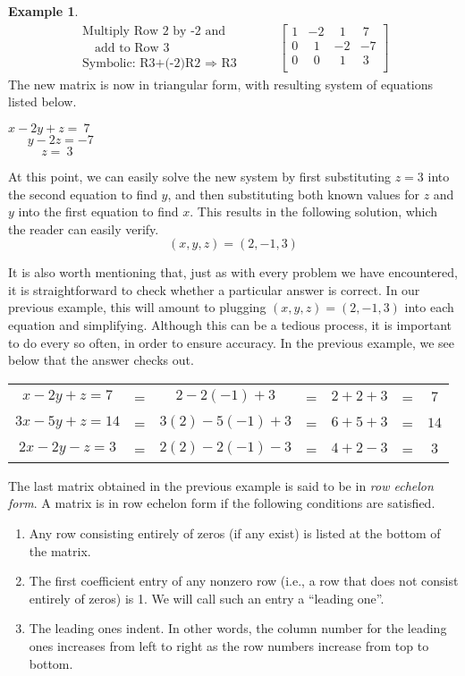 \documentclass[12pt]{book}
\theoremstyle{definition}
\newtheorem{example}{Example}
\begin{document}
\begin{example}
\begin{eqnarray*}
\begin{array}{l}
\text{Multiply Row 2 by -2 and}\\
\text{~~~add to Row 3}\\
\text{Symbolic: R3+(-2)R2~}\Rightarrow \text{~R3}
\end{array}
&&
~~~~~~\left[
\begin{array}{ccc|c}
1 & -2 & ~~1 & ~7\\
0 & ~~1 & -2 & -7\\
0 & ~~0 & ~~1 & ~3\\
\end{array}
\right]
\end{eqnarray*}
The new matrix is now in triangular form, with resulting system of equations listed below.
\begin{center}
$x-2y+z=~7$\\
$~~~~~~~y-2z=-7$\\
$~~~~~~~~~~~~z=~3$
\end{center}
At this point, we can easily solve the new system by first substituting $z=3$ into the second equation to find $y$, and then substituting both known values for $z$ and $y$ into the first equation to find $x$.  This results in the following solution, which the reader can easily verify.
$$(x,y,z)=(2,-1,3)$$
\end{example}
It is also worth mentioning that, just as with every problem we have encountered, it is straightforward to check whether a particular answer is correct.  In our previous example, this will amount to plugging $(x,y,z)=(2,-1,3)$ into each equation and simplifying.  Although this can be a tedious process, it is important to do every so often, in order to ensure accuracy.  In the previous example, we see below that the answer checks out.
\begin{center}
\begin{tabular}{ccccccc}
$x-2y+z=7$&=&$2-2(-1)+3$&=&$2+2+3$&=&$7$\\
$3x-5y+z=14$&=&$3(2)-5(-1)+3$&=&$6+5+3$&=&$14$\\
$2x-2y-z=3$&=&$2(2)-2(-1)-3$&=&$4+2-3$&=&$3$
\end{tabular}
\end{center}
The last matrix obtained in the previous example is said to be in {\it row echelon form}.  A matrix is in row echelon form if the following conditions are satisfied.
\begin{enumerate}
\item Any row consisting entirely of zeros (if any exist) is listed at the bottom of the matrix.
\item The first coefficient entry of any nonzero row (i.e., a row that does not consist entirely of zeros) is 1.  We will call such an entry a ``leading one''.
\item The leading ones indent.  In other words, the column number for the leading ones increases from left to right as the row numbers increase from top to bottom.
\end{enumerate}
\end{document}
